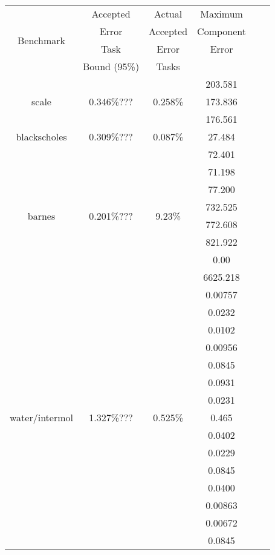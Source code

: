 \documentclass[11pt]{article}
\begin{document}
\begin {table}[t]
\centering
\begin{tabular}{c|ccccc}
	                           & Accepted & Actual & Maximum\\
	\multirow{2}{*}{Benchmark} & Error  & Accepted & Component  \\
	                           & Task   & Error & Error\\
	                           & Bound (95\%)  & Tasks & \\
	\hline
	\multirow{3}{*}{scale} & \multirow{3}{*}{0.346\%???} & \multirow{3}{*}{0.258\%} & 203.581\\
	&  &  &  173.836\\
	&  &  & 176.561\\
	\hline
	
	\multirow{1}{*}{blackscholes} & \multirow{1}{*}{0.309\%???} & \multirow{1}{*}{0.087\%} & 27.484\\
	\hline
	\multirow{8}{*}{barnes} & \multirow{8}{*}{0.201\%???} & \multirow{8}{*}{9.23\%} & 72.401\\
	&  &  & 71.198\\
	&  &  & 77.200\\
	&  &  & 732.525\\
	&  &  & 772.608\\
	&  &  & 821.922\\
	&  &  & 0.00\\
	&  &  & 6625.218\\
	\hline
	
	\multirow{18}{*}{water/intermol} & \multirow{18}{*}{1.327\%???} & \multirow{18}{*}{0.525\%} & 0.00757\\
	&  &  & 0.0232\\
	&  &  & 0.0102\\
	
	&  &  &  0.00956\\
	&  &  &  0.0845\\
	&  &  &  0.0931\\
	
	&  &  &  0.0231\\
	&  &  & 0.465\\
	&  &  &  0.0402\\
	
	
	&  &  &  0.0229\\
	&  &  &  0.0845\\
	&  &  &  0.0400\\
	
	&  &  &  0.00863\\
	&  &  &  0.00672\\
	&  &  &  0.0845\\
	

\end{tabular}
\end{table}
\end{document}
